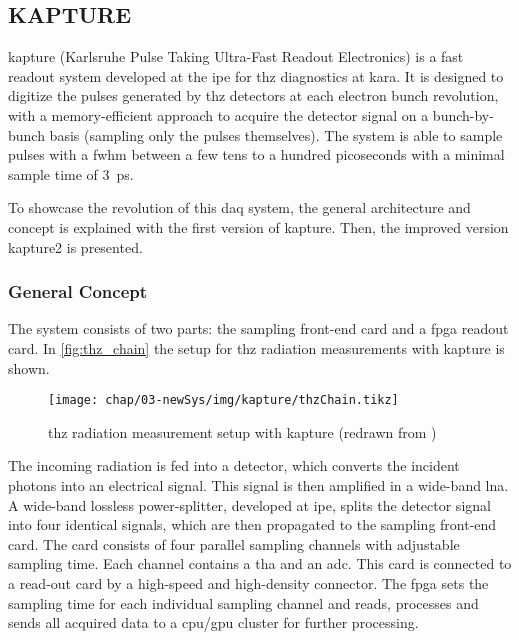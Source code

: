 \subsection{KAPTURE}
\Gls{kapture} (Karlsruhe Pulse Taking Ultra-Fast Readout Electronics) is a fast readout system developed at the \gls{ipe} for \gls{thz} diagnostics at \gls{kara}. 
It is designed to digitize the pulses generated by \gls{thz} detectors at each electron bunch revolution, with a memory-efficient approach to acquire the detector signal on a bunch-by-bunch basis (sampling only the pulses themselves). 
The system is able to sample pulses with a \gls{fwhm} between a few tens to a hundred picoseconds with a minimal sample time of \SI{3}{\pico \second}. \cite{caselleKAP}

To showcase the revolution of this \gls{daq} system, the general architecture and concept is explained with the first version of \gls{kapture}.
Then, the improved version \gls{kapture2} is presented.

\subsubsection*{General Concept}
The system consists of two parts: the sampling front-end card and a \gls{fpga} readout card. In \autoref{fig:thz_chain} the setup for \gls{thz} radiation measurements with \gls{kapture} is shown. 

\begin{figure}[H]
	\centering
	\texttt{[image: chap/03-newSys/img/kapture/thzChain.tikz]}
	\caption[THz measurement with KAPTURE]{\gls{thz} radiation measurement setup with \gls{kapture} (redrawn from \cite{caselle2014})}
	\label{fig:thz_chain}
\end{figure}
The incoming radiation is fed into a detector, which converts the incident photons into an electrical signal. 
This signal is then amplified in a wide-band \gls{lna}. 
A wide-band lossless power-splitter, developed at \gls{ipe}, splits the detector signal into four identical signals, which are then propagated to the sampling front-end card. 
The card consists of four parallel sampling channels with adjustable sampling time. 
Each channel contains a \gls{tha} and an \gls{adc}. 
This card is connected to a read-out card by a high-speed and high-density connector. 
The \gls{fpga} sets the sampling time for each individual sampling channel and reads, processes and sends all acquired data to a \gls{cpu}/\gls{gpu} cluster for further processing. \cite{caselle2014}



